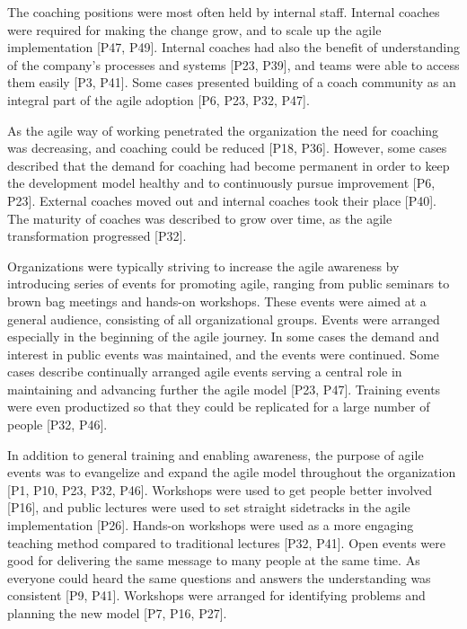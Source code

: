 
The coaching positions were most often held by internal staff.
Internal coaches were required for making the change grow, and to scale up the
agile implementation [P47, P49]. Internal coaches had also the benefit of
understanding of the company's processes and systems [P23, P39], and teams were
able to access them easily [P3, P41]. Some cases presented building of a coach
community as an integral part of the agile adoption [P6, P23, P32, P47].

As the agile way of working penetrated the organization the need for coaching
was decreasing, and coaching could be reduced [P18, P36]. However, some cases
described that the demand for coaching had become permanent in order to keep the
development model healthy and to continuously pursue improvement [P6, P23].
External coaches moved out and internal coaches took their place [P40].
The maturity of coaches was described to grow over time, as the agile
transformation progressed [P32].




Organizations were typically striving to increase the agile awareness by introducing
series of events for promoting agile, ranging from public seminars to brown bag
meetings and hands-on workshops. These events were aimed at a general audience,
consisting of all organizational groups. Events were arranged especially in the
beginning of the agile journey. In some cases the demand and interest in public
events was maintained, and the events were continued.
Some cases describe continually arranged agile events serving a central role in
maintaining and advancing further the agile model [P23, P47].
Training events were even productized so that they could be replicated for a
large number of people [P32, P46].

In addition to general training and enabling awareness, the purpose of agile
events was to evangelize and expand the agile model throughout the organization
[P1, P10, P23, P32, P46].
Workshops were used to get people better involved [P16], and public lectures
were used to set straight sidetracks in the agile implementation [P26].
Hands-on workshops were used as a more engaging teaching method compared to
traditional lectures [P32, P41]. Open events were good for delivering the same
message to many people at the same time. As everyone could heard the same
questions and answers the understanding was consistent [P9, P41].
Workshops were arranged for identifying problems and planning the new model [P7,
P16, P27].


